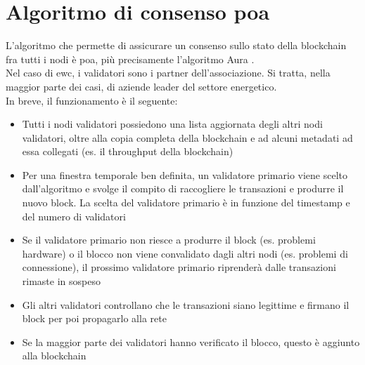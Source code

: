 \documentclass[12pt, letterpaper, twoside]{article}
\begin{document}
\newpage
 
\section{Algoritmo di consenso \gls{poa}}
L'algoritmo che permette di assicurare un consenso sullo stato della blockchain fra tutti i nodi è \gls{poa}, più precisamente l'algoritmo Aura \cite{art:aura}\cite{wiki:poa}. \\
Nel caso di \gls{ewc}, i validatori sono i partner dell'associazione.
Si tratta, nella maggior parte dei casi, di aziende leader del settore energetico. \\
In breve, il funzionamento è il seguente:
 
\begin{itemize}
    \item Tutti i nodi validatori possiedono una lista aggiornata degli altri nodi validatori, oltre alla copia completa della blockchain e ad alcuni metadati ad essa collegati (es. il throughput della blockchain)
    \item Per una finestra temporale ben definita, un validatore primario viene scelto dall'algoritmo e svolge il compito di raccogliere le transazioni e produrre il nuovo block. La scelta del validatore primario è in funzione del timestamp e del numero di validatori
    \item Se il validatore primario non riesce a produrre il block (es. problemi hardware) o il blocco non viene convalidato dagli altri nodi (es. problemi di connessione), il prossimo validatore primario riprenderà dalle transazioni rimaste in sospeso
    \item Gli altri validatori controllano che le transazioni siano legittime e firmano il block per poi propagarlo alla rete
    \item Se la maggior parte dei validatori hanno verificato il blocco, questo è aggiunto alla blockchain
\end{itemize}
 
\newpage
 
\end{document}
